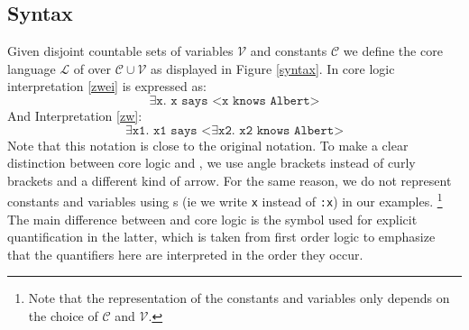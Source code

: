 \subsection{Syntax}
Given disjoint countable sets of variables $\mathcal{V}$ and constants $\mathcal{C}$ we define the core language $\mathcal{L}$ of \nthree over 
$\mathcal{C}\cup\mathcal{V}$ as displayed in Figure \ref{syntax}. 
In core logic interpretation \ref{zwei} is expressed as:
\[
 \exists \texttt{x. x says <x knows Albert>}
\]
And Interpretation \ref{zw}:
\[
 \exists \texttt{x1. x1 says <}\exists\texttt{x2. x2 knows Albert>} 
\]
Note that this notation is close to the original \nthree notation. To make a clear distinction between core logic and \nthreelogic, 
we use angle brackets instead of curly brackets and
a different kind of arrow. 
For the same reason, we do not represent constants and variables using \iri{}s (ie we write \texttt{x} instead of \texttt{:x}) in our examples.%
\footnote{Note that the representation of the constants and variables only depends on the choice of $\mathcal{C}$ and $\mathcal{V}$.} 
The main difference between \nthreelogic and core logic is the symbol used for explicit quantification in the latter, 
which is taken from first order logic to emphasize 
that the quantifiers here are interpreted in the order they occur.






